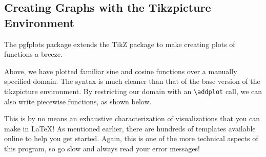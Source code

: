 \documentclass[12pt]{article}	%
\begin{document}
\subsection{Creating Graphs with the Tikzpicture Environment}

The pgfplots package extends the TikZ package to make creating plots of functions a breeze.

	\begin{center}
	\end{center}

\noindent Above, we have plotted familiar sine and cosine functions over a manually specified domain. The syntax is much cleaner than that of the base version of the tikzpicture environment. By restricting our domain with an \verb!\addplot! call, we can also write piecewise functions, as shown below.

	\begin{center}
	\end{center}

\noindent This is by no means an exhaustive characterization of visualizations that you can make in \LaTeX{}! As mentioned earlier, there are hundreds of templates available online to help you get started. Again, this is one of the more technical aspects of this program, so go slow and always read your error messages!
\end{document}
